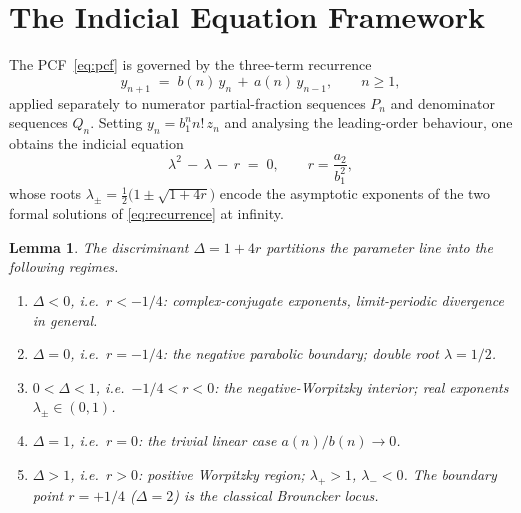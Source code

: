 \documentclass[11pt]{amsart}
\newtheorem{lemma}[theorem]{Lemma}
\theoremstyle{definition}
\theoremstyle{remark}
\begin{document}
\section{The Indicial Equation Framework}\label{sec:framework}

The PCF~\eqref{eq:pcf} is governed by the three-term recurrence
\begin{equation}\label{eq:recurrence}
  y_{n+1} \;=\; b(n)\, y_n \,+\, a(n)\, y_{n-1},
  \qquad n \ge 1,
\end{equation}
applied separately to numerator partial-fraction sequences
$P_n$ and denominator sequences $Q_n$.  Setting $y_n = b_1^n n!\, z_n$
and analysing the leading-order behaviour, one obtains the indicial
equation
\begin{equation}\label{eq:indicial}
  \lambda^2 \,-\, \lambda \,-\, r \;=\; 0,
  \qquad r = \frac{a_2}{b_1^2},
\end{equation}
whose roots $\lambda_\pm = \tfrac{1}{2}\bigl(1 \pm \sqrt{1 + 4r}\bigr)$
encode the asymptotic exponents of the two formal solutions of
\eqref{eq:recurrence} at infinity.

\begin{lemma}\label{lem:strata}
The discriminant $\Delta = 1 + 4r$ partitions the parameter line
into the following regimes.
\begin{enumerate}[label={\upshape(\roman*)}]
\item $\Delta < 0$, i.e.\ $r < -1/4$: complex-conjugate exponents,
limit-periodic divergence in general.
\item $\Delta = 0$, i.e.\ $r = -1/4$: the negative parabolic
boundary; double root $\lambda = 1/2$.
\item $0 < \Delta < 1$, i.e.\ $-1/4 < r < 0$: the
\emph{negative-Worpitzky interior}; real exponents
$\lambda_\pm \in (0,1)$.
\item $\Delta = 1$, i.e.\ $r = 0$: the trivial linear case
$a(n)/b(n) \to 0$.
\item $\Delta > 1$, i.e.\ $r > 0$: positive Worpitzky region;
$\lambda_+ > 1$, $\lambda_- < 0$.  The boundary point $r = +1/4$
($\Delta = 2$) is the classical Brouncker locus.
\end{enumerate}
\end{lemma}
\end{document}
